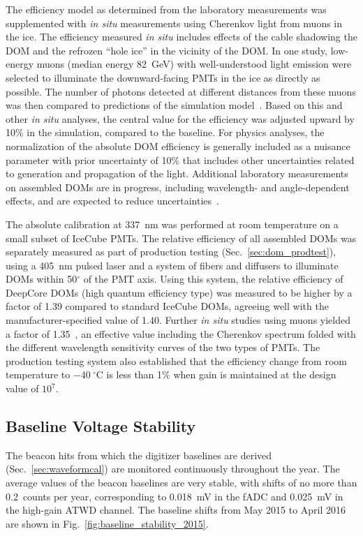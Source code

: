 The efficiency model as determined from the laboratory measurements was supplemented with \textit{in
  situ} measurements using Cherenkov light from muons in the ice. The
efficiency measured \textit{in situ} includes effects of the cable
shadowing the DOM and the refrozen ``hole ice'' in the vicinity of the
DOM. In one
study, low-energy muons (median energy 82~GeV) with well-understood light
emission were selected to illuminate the downward-facing PMTs in the ice as
directly as possible. The number of photons detected at different
distances from these muons was then compared to predictions of the
simulation model~\cite{IC3:ereco}.  Based on this and other \textit{in
  situ} analyses, the central value for the efficiency was adjusted upward
by 10\% in the simulation, compared to the baseline.  For physics analyses,
the normalization of the absolute DOM efficiency is generally included as a
nuisance parameter with prior uncertainty of 10\% that includes other uncertainties related to
generation and propagation of the light. Additional laboratory measurements
on assembled DOMs are in progress, including wavelength- and angle-dependent
effects, and are expected to reduce uncertainties~\cite{ICECUBE:DOMEFF}.

The absolute calibration at 337~nm was performed at room temperature on a
small subset of IceCube PMTs. The relative efficiency of all assembled DOMs
was separately measured as part of production testing
(Sec.~\ref{sec:dom_prodtest}), using a 405~nm pulsed laser and a system of
fibers and diffusers to illuminate DOMs within 50$^{\circ}$ of the
PMT axis.  Using this system, the relative efficiency of DeepCore DOMs
(high quantum efficiency type) was measured to be higher by a factor
of 1.39
compared to standard IceCube DOMs, agreeing well with the
manufacturer-specified value of 1.40. Further \textit{in situ} studies
using muons yielded a factor of 1.35~\cite{ICECUBE:DC}, an
effective value including the Cherenkov spectrum folded with the different
wavelength sensitivity curves of the two types of PMTs.  The production
testing system also established that the efficiency change from room
temperature to $-40\ ^{\circ}\mathrm{C}$ is less than 1\% when gain is maintained at
the design value of $10^7$.

\subsection{\label{sec:baselines}Baseline Voltage Stability}

The beacon hits from which the digitizer baselines are derived
(Sec.~\ref{sec:waveformcal}) are 
monitored continuously throughout the year. The average values of the
beacon baselines are very stable, with shifts of no more than
0.2~counts per year, corresponding to 0.018~mV in the fADC and
0.025~mV in the high-gain ATWD channel. The baseline shifts from May
2015 to April 2016 are shown in Fig.~\ref{fig:baseline_stability_2015}. 

